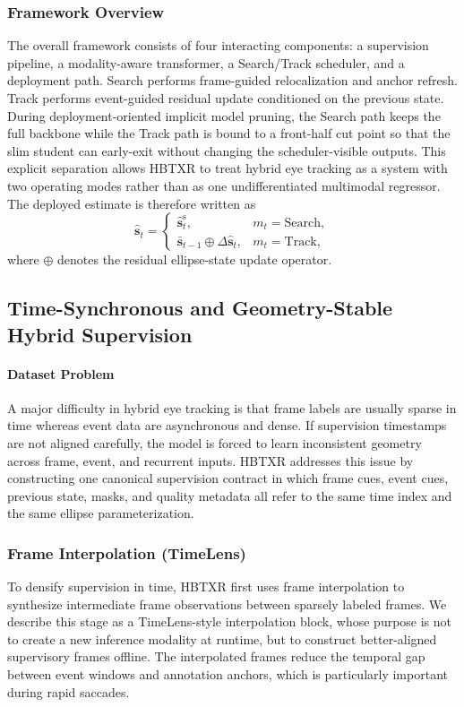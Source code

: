 \documentclass[journal]{IEEEtran}
\begin{document}
\subsubsection{Framework Overview}
The overall framework consists of four interacting components: a supervision pipeline, a modality-aware transformer, a Search/Track scheduler, and a deployment path. Search performs frame-guided relocalization and anchor refresh. Track performs event-guided residual update conditioned on the previous state. During deployment-oriented implicit model pruning, the Search path keeps the full backbone while the Track path is bound to a front-half cut point so that the slim student can early-exit without changing the scheduler-visible outputs. This explicit separation allows HBTXR to treat hybrid eye tracking as a system with two operating modes rather than as one undifferentiated multimodal regressor. The deployed estimate is therefore written as
\begin{equation}
\hat{\mathbf{s}}_t=
\begin{cases}
\hat{\mathbf{s}}_t^{\mathrm{s}}, & m_t=\mathrm{Search},\\
\bar{\mathbf{s}}_{t-1}\oplus\Delta\hat{\mathbf{s}}_t, & m_t=\mathrm{Track},
\end{cases}
\end{equation}
where $\oplus$ denotes the residual ellipse-state update operator.


\subsection{Time-Synchronous and Geometry-Stable Hybrid Supervision}
\paragraph*{Dataset Problem}
A major difficulty in hybrid eye tracking is that frame labels are usually sparse in time whereas event data are asynchronous and dense. If supervision timestamps are not aligned carefully, the model is forced to learn inconsistent geometry across frame, event, and recurrent inputs. HBTXR addresses this issue by constructing one canonical supervision contract in which frame cues, event cues, previous state, masks, and quality metadata all refer to the same time index and the same ellipse parameterization.

\subsubsection{Frame Interpolation (TimeLens)}
To densify supervision in time, HBTXR first uses frame interpolation to synthesize intermediate frame observations between sparsely labeled frames. We describe this stage as a TimeLens-style interpolation block, whose purpose is not to create a new inference modality at runtime, but to construct better-aligned supervisory frames offline. The interpolated frames reduce the temporal gap between event windows and annotation anchors, which is particularly important during rapid saccades.
\end{document}
